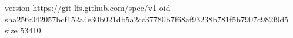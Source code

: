 version https://git-lfs.github.com/spec/v1
oid sha256:042057bcf152a4e30b021db5a2cc37780b7f68af93238b781f5b7907c982f9d5
size 53410
